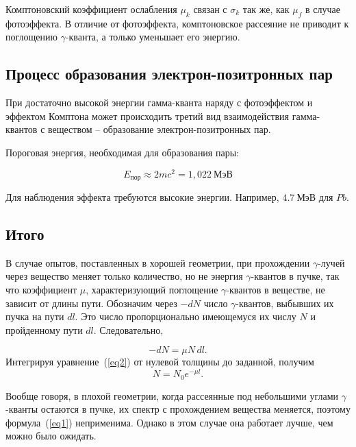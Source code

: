 \documentclass[a4paper, 12pt]{article}
\begin{document}
            Комптоновский коэффициент ослабления $\mu_k$ связан с $\sigma_k$ так же, как $\mu_f$ в случае фотоэффекта. В отличие от фотоэффекта, комптоновское рассеяние не приводит к поглощению $\gamma$-кванта, а только уменьшает его энергию.

        \subsection{Процесс образования электрон-позитронных пар}

            При достаточно высокой энергии гамма-кванта наряду с фотоэффектом и эффектом Комптона может происходить третий вид взаимодействия гамма-квантов с веществом -- образование электрон-позитронных пар.

            Пороговая энергия, необходимая для образования пары:

            $$
                E_{пор} \approx 2mc^2 = 1,022~МэВ
            $$

            Для наблюдения эффекта требуются высокие энергии. Например, $4.7~МэВ$ для $Pb$.


        \subsection{Итого}

    	    В случае опытов, поставленных в хорошей геометрии, при прохождении $\gamma$-лучей через вещество меняет только количество, но не энергия $\gamma$-квантов в пучке, так что коэффициент $\mu$, характеризующий поглощение $\gamma$-квантов в веществе, не зависит от длины пути. Обозначим через $-dN$ число $\gamma$-квантов, выбывших их пучка на пути $dl$. Это число пропорционально имеющемуся их числу $N$ и пройденному пути $dl$. Следовательно,

            \begin{equation}
    	    	\label{eq2}
    	    	-dN = \mu N \, dl.
    	    \end{equation}
    	    Интегрируя уравнение~(\ref{eq2}) от нулевой толщины до заданной, получим
    	    \begin{equation}
    	    	\label{eq3}
    	    	N = N_0 e^{-\mu l}.
    	    \end{equation}

    	    Вообще говоря, в плохой геометрии, когда рассеянные под небольшими углами $\gamma$-кванты остаются в пучке, их спектр с прохождением вещества меняется, поэтому формула~(\ref{eq1}) неприменима. Однако в этом случае она работает лучше, чем можно было ожидать.
\end{document}
